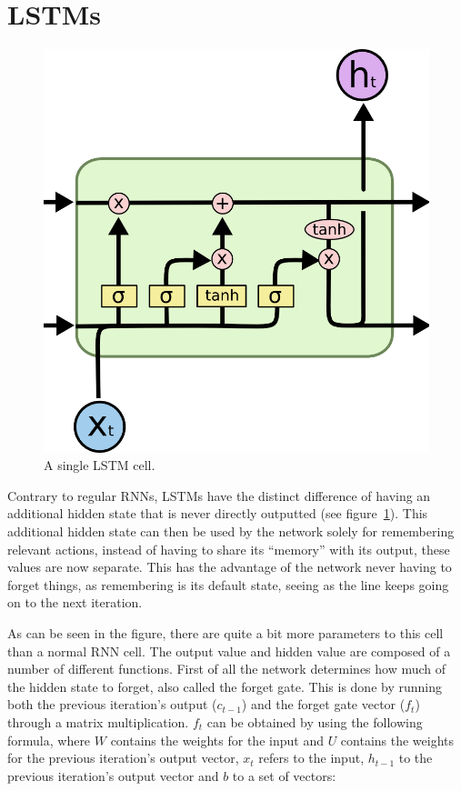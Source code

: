 \section{LSTMs}

\begin{figure}
	\begin{center}
		\includegraphics[scale=0.5]{rnn/lstm_cell}
	\end{center}
	\caption{A single LSTM cell.\label{fig:lstm_cell}}
\end{figure}

Contrary to regular RNNs, LSTMs have the distinct difference of having an additional hidden state that is never directly outputted (see figure~\ref{fig:lstm_cell}). This additional hidden state can then be used by the network solely for remembering relevant actions, instead of having to share its \enquote{memory} with its output, these values are now separate. This has the advantage of the network never having to forget things, as remembering is its default state, seeing as the line keeps going on to the next iteration.

As can be seen in the figure, there are quite a bit more parameters to this cell than a normal RNN cell. The output value and hidden value are composed of a number of different functions. First of all the network determines how much of the hidden state to forget, also called the forget gate. This is done by running both the previous iteration's output ($c_{t-1}$) and the forget gate vector ($f_t$) through a matrix multiplication. $f_t$ can be obtained by using the following formula, where $W$ contains the weights for the input and $U$ contains the weights for the previous iteration's output vector, $x_t$ refers to the input, $h_{t-1}$ to the previous iteration's output vector and $b$ to a set of vectors:

